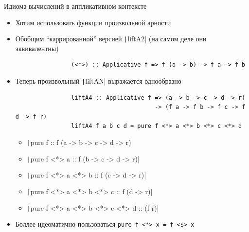     \begin{frame}[fragile]{Идиома вычислений в аппликативном контексте}
        \vspace{-0.5em}
        \begin{itemize}
            \item Хотим использовать функции произвольной арности
            \item Обобщим ``каррированной'' версией \texttt|liftA2| (на самом деле они эквивалентны)
            \begin{verbatim}
                (<*>) :: Applicative f => f (a -> b) -> f a -> f b
            \end{verbatim}
            \item Теперь произвольный \texttt|liftAN| выражается однообразно
            \begin{verbatim}
                liftA4 :: Applicative f => (a -> b -> c -> d -> r)
                                        -> (f a -> f b -> f c -> f d -> f r)
                liftA4 f a b c d = pure f <*> a <*> b <*> c <*> d
            \end{verbatim}
            \begin{itemize}
                \item \texttt|pure f      :: f (a -> b -> c -> d -> r)|
                \item \texttt|pure f <*> a     :: f (b -> c -> d -> r)|
                \item \texttt|pure f <*> a <*> b    :: f (c -> d -> r)|
                \item \texttt|pure f <*> a <*> b <*> c   :: f (d -> r)|
                \item \texttt|pure f <*> a <*> b <*> c <*> d  :: (f r)|
            \end{itemize}
            \item Боллее идеоматично пользоваться \texttt{pure f <*> x = f <\$> x}
        \end{itemize}
    \end{frame}

